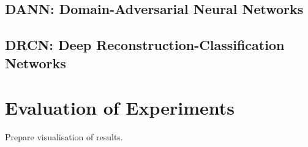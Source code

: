 \subsection{DANN: Domain-Adversarial Neural Networks}

\subsection{DRCN: Deep Reconstruction-Classification Networks}

\section{Evaluation of Experiments}

Prepare visualisation of results.
